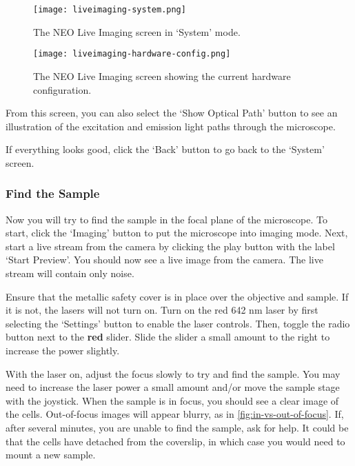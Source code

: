 \documentclass[10pt,a4paper,oneside]{book}
\begin{document}
\begin{figure}[ht]
    \centering
    \texttt{[image: liveimaging-system.png]}
    \caption{The NEO Live Imaging screen in `System' mode.}
    \label{fig:liveimaging-system}
\end{figure}

\begin{figure}[ht]
    \centering
    \texttt{[image: liveimaging-hardware-config.png]}
    \caption{The NEO Live Imaging screen showing the current hardware configuration.}
    \label{fig:liveimaging-hardware-config}
\end{figure}

From this screen, you can also select the `Show Optical Path' button to see an illustration of the excitation and emission light paths through the microscope.

If everything looks good, click the `Back' button to go back to the `System' screen.

\subsubsection{Find the Sample}

\newline

Now you will try to find the sample in the focal plane of the microscope. To start, click the `Imaging' button to put the microscope into imaging mode. Next, start a live stream from the camera by clicking the play button with the label `Start Preview'. You should now see a live image from the camera. The live stream will contain only noise.

Ensure that the metallic safety cover is in place over the objective and sample. If it is not, the lasers will not turn on. Turn on the red 642 nm laser by first selecting the `Settings' button to enable the laser controls. Then, toggle the radio button next to the \textbf{red} slider. Slide the slider a small amount to the right to increase the power slightly.

With the laser on, adjust the focus slowly to try and find the sample. You may need to increase the laser power a small amount and/or move the sample stage with the joystick. When the sample is in focus, you should see a clear image of the cells. Out-of-focus images will appear blurry, as in \autoref{fig:in-vs-out-of-focus}. If, after several minutes, you are unable to find the sample, ask for help. It could be that the cells have detached from the coverslip, in which case you would need to mount a new sample.
\end{document}
